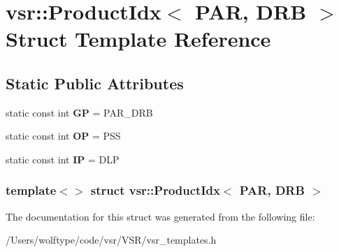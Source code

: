 \hypertarget{structvsr_1_1_product_idx_3_01_p_a_r_00_01_d_r_b_01_4}{\section{vsr\-:\-:Product\-Idx$<$ P\-A\-R, D\-R\-B $>$ Struct Template Reference}
\label{structvsr_1_1_product_idx_3_01_p_a_r_00_01_d_r_b_01_4}
}
\subsection*{Static Public Attributes}
\begin{DoxyCompactItemize}
\item 
\hypertarget{structvsr_1_1_product_idx_3_01_p_a_r_00_01_d_r_b_01_4_af5c77624621a2beac22aa37aa6a232f9}{static const int {\bfseries G\-P} = P\-A\-R\-\_\-\-D\-R\-B}\label{structvsr_1_1_product_idx_3_01_p_a_r_00_01_d_r_b_01_4_af5c77624621a2beac22aa37aa6a232f9}

\item 
\hypertarget{structvsr_1_1_product_idx_3_01_p_a_r_00_01_d_r_b_01_4_a26965107ee592c7e3b79059e308d9a0d}{static const int {\bfseries O\-P} = P\-S\-S}\label{structvsr_1_1_product_idx_3_01_p_a_r_00_01_d_r_b_01_4_a26965107ee592c7e3b79059e308d9a0d}

\item 
\hypertarget{structvsr_1_1_product_idx_3_01_p_a_r_00_01_d_r_b_01_4_a96f2230a92a40a48dd99dc3ac617a453}{static const int {\bfseries I\-P} = D\-L\-P}\label{structvsr_1_1_product_idx_3_01_p_a_r_00_01_d_r_b_01_4_a96f2230a92a40a48dd99dc3ac617a453}

\end{DoxyCompactItemize}
\subsubsection*{template$<$$>$ struct vsr\-::\-Product\-Idx$<$ P\-A\-R, D\-R\-B $>$}



The documentation for this struct was generated from the following file\-:\begin{DoxyCompactItemize}
\item 
/\-Users/wolftype/code/vsr/\-V\-S\-R/vsr\-\_\-templates.\-h\end{DoxyCompactItemize}
